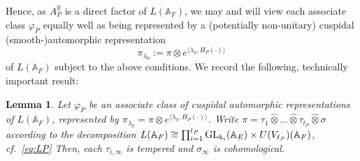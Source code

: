 \documentclass[a4paper,10pt]{amsart}
\newtheorem{lem}[equation]{Lemma}
\theoremstyle{definition}
\numberwithin{equation}{section}
\def\R{\mathbb R}
\def\A{\mathbb A}
\def\GL{{\rm GL}}
\begin{document}
Hence, as $A^\R_P$ is a direct factor of $L(\A_F)$, we may and will view each associate class $\varphi_{P}$ equally well as being represented by a (potentially non-unitary) cuspidal (smooth-)automorphic representation 
$$\pi_{\lambda_0}:=\pi\otimes e^{\langle \lambda_0,H_{P}(\cdot)\rangle}$$ of $L(\A_F)$ subject to the above conditions. We record the following, technically important result:

\begin{lem}\label{lem:varphis}
Let $\varphi_{P}$ be an associate class of cuspidal automorphic representations of $L(\A_F)$, represented by $\pi_{\lambda_0}=\pi\otimes e^{\langle \lambda_0,H_{P}(\cdot)\rangle}$. Write $\pi=\tau_1\hat\otimes...\hat\otimes\tau_{t_P}\hat\otimes\sigma$ according to the decomposition 
$L(\A_F)\cong \prod_{i=1}^{t_P}\GL_{k_i}(\A_E)\times U(V_{\ell_P})(\A_F)$, cf.\ \eqref{eq:LP} Then, each $\tau_{i,\infty}$ is tempered and $\sigma_\infty$ is cohomological.
\end{lem}
\end{document}
